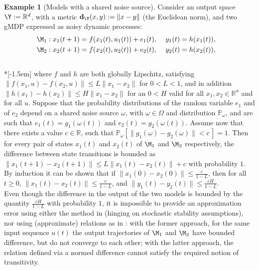 \documentclass[letterpaper, 10 pt, conference]{amsart}
\theoremstyle{definition}
\theoremstyle{example}
\newtheorem{example}{Example}
\theoremstyle{remark}
\begin{document}
\begin{example}[Models with a shared noise source] \label{Ex:delISS} 
Consider an output space $\Y:=\mathbb R^d$, 
with a metric $\mathbf d_\Y(x,y):= \|x-y\|$ (the Euclidean norm), 
and two gMDP expressed as noisy dynamic processes: \\[-1.5em]
\begin{align*}&\M_1:   
x_1(t+1)=f(x_1(t),u_1(t))+ e_1(t)
,&\ y_1(t)&=h(x_1(t)),&\\ &\M_2:   
x_2(t+1)=f(x_2(t),u_2(t))+ e_2(t)
, &\ 
y_2(t)&=h(x_2(t)) , &
\end{align*}\\*[-1.5em]
where $f$ and $h$ are both globally Lipschitz, 
satisfying 
$\|f(x_1,u)-f(x_2,u)\|\leq L \|x_1-x_2\|$ for $0<L<1$,  
and in addition $\|h(x_1)-h(x_2)\|\leq H \|x_1-x_2\|$ for an $0<H$ valid for all $x_1,x_2\in\mathbb R^n$ and for all $u$.  Suppose that the probability distributions of the random variable $e_1$ and of $e_2$ depend on a shared noise source $\omega$, with $\omega\in\Omega$ and distribution $\mathbb P_{\omega}$,   
and are such that $e_1(t)=g_1(\omega(t))$ and $e_2(t)=g_2(\omega(t))$.  
Assume now that there exists a value $c\in\mathbb R$, such that $\mathbb P_{\omega}\left[\|g_1(\omega )-g_2(\omega)\|<c\,\right]=1$.  
Then for every pair of states $x_1(t)$ and $x_2(t)$ of $\M_1$ and $\M_2$ respectively, the difference between state transitions is bounded as
\(\textstyle\|x_1(t+1)-x_2(t+1)\|\leq L \|x_1(t)-x_2(t)\|+c\)
with probability $1$. 
By induction it can be shown that if $\|x_1(0)-x_2(0)\|\leq \frac{c}{1-L}$,  
then for all $t\geq 0$, 
$\|x_1(t)-x_2(t)\|\leq \frac{c}{1-L}$, 
and \(\|y_1(t)-y_2(t)\|\leq \frac{cH}{1-L}\). \smallskip\\ 
Even though the difference in the output of the two models is bounded by the quantity $\frac{cH}{1-L}$ with probability $1$,  
it is impossible to provide an approximation error using either the method in \cite{Julius2009a} (hinging on stochastic stability assumptions), nor using (approximate) relations as in \cite{Desharnais2008,cDAK12}:  
with the former approach, for the same input sequence $u(t)$ the output trajectories of $\M_1$ and $\M_2$ have bounded difference, but do not converge to each other;  
with the latter approach, the relation defined via a normed difference cannot satisfy the required notion of transitivity. 
\end{example}
\smallskip
 
\end{document}
